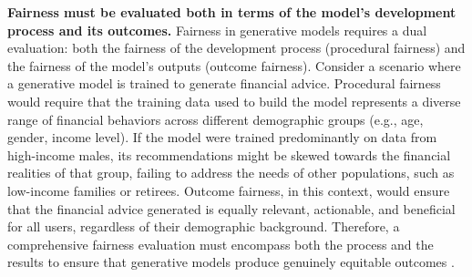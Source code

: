 \textbf{Fairness must be evaluated both in terms of the model’s development process and its outcomes.}
Fairness in generative models requires a dual evaluation: both the fairness of the development process (procedural fairness) and the fairness of the model’s outputs (outcome fairness). Consider a scenario where a generative model is trained to generate financial advice. Procedural fairness would require that the training data used to build the model represents a diverse range of financial behaviors across different demographic groups (e.g., age, gender, income level). If the model were trained predominantly on data from high-income males, its recommendations might be skewed towards the financial realities of that group, failing to address the needs of other populations, such as low-income families or retirees. Outcome fairness, in this context, would ensure that the financial advice generated is equally relevant, actionable, and beneficial for all users, regardless of their demographic background. Therefore, a comprehensive fairness evaluation must encompass both the process and the results to ensure that generative models produce genuinely equitable outcomes \cite{ibm2022fairness}.



